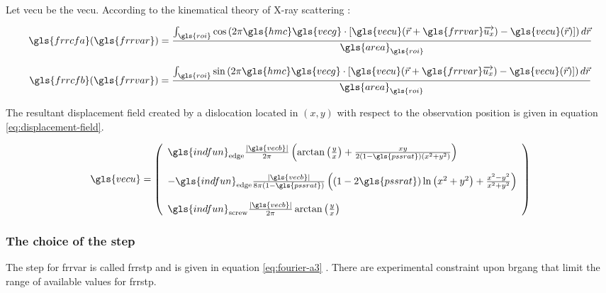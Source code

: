 Let \gls{vecu} be the \glsdesc{vecu}.
According to the kinematical theory of X-ray scattering \cite{W1990}:

\begin{equation}\label{eq:fourier-a-warren}
\gls{frrcfa}(\gls{frrvar}) = \frac{\int_{\gls{roi}} \cos \left( 2 \pi \gls{hmc} \gls{vecg} \cdot \left[ \gls{vecu}(\vec{r} + \gls{frrvar} \overrightarrow{u_x}) - \gls{vecu}(\vec{r}) \right] \right) d\vec{r}}{\gls{area}_{\gls{roi}}}
\end{equation}

\begin{equation}\label{eq:fourier-b-warren}
\gls{frrcfb}(\gls{frrvar}) = \frac{\int_{\gls{roi}} \sin \left( 2 \pi \gls{hmc} \gls{vecg} \cdot \left[ \gls{vecu}(\vec{r} + \gls{frrvar} \overrightarrow{u_x}) - \gls{vecu}(\vec{r}) \right] \right) d\vec{r}}{\gls{area}_{\gls{roi}}}
\end{equation}

\medskip

The resultant displacement field created by a dislocation located in \( ( x, y ) \) with respect to the observation position is given in equation \eqref{eq:displacement-field}.

\begin{align}\label{eq:displacement-field}
\gls{vecu} =
  \left( \begin{array}{l}
    \gls{indfun}_{\mathrm{edge}} \frac{| \gls{vecb} |}{2 \pi} \left( \arctan \left( \frac{y}{x} \right) + \frac{x y}{2 (1 - \gls{pssrat}) \left( x^2 + y^2 \right)} \right)
    \\[5mm]
    - \gls{indfun}_{\mathrm{edge}} \frac{| \gls{vecb} |}{8 \pi (1 - \gls{pssrat})} \left( (1 - 2 \gls{pssrat}) \ln \left( x^2 + y^2 \right) + \frac{x^2 - y^2}{x^2 + y^2} \right)
    \\[5mm]
    \gls{indfun}_{\mathrm{screw}} \frac{| \gls{vecb} |}{2 \pi} \arctan \left( \frac{y}{x} \right)
  \end{array} \right)
\end{align}

\subsubsection{The choice of the step}

The step for \gls{frrvar} is called \gls{frrstp} and is given in equation \eqref{eq:fourier-a3} \cite{W1990}.
There are experimental constraint upon \gls{brgang} that limit the range of available values for \gls{frrstp}.

